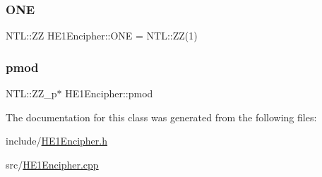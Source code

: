 \subsubsection{\texorpdfstring{O\+NE}{ONE}}
{\footnotesize\ttfamily N\+T\+L\+::\+ZZ H\+E1\+Encipher\+::\+O\+NE = N\+T\+L\+::\+ZZ(1)\hspace{0.3cm}{\ttfamily [static]}}

\mbox{\label{classHE1Encipher_a4fa8ff49fc93cf01a0814aa83141e725}} 
\subsubsection{\texorpdfstring{pmod}{pmod}}
{\footnotesize\ttfamily N\+T\+L\+::\+Z\+Z\+\_\+p$\ast$ H\+E1\+Encipher\+::pmod\hspace{0.3cm}{\ttfamily [protected]}}



The documentation for this class was generated from the following files\+:\begin{DoxyCompactItemize}
\item 
include/\hyperlink{HE1Encipher_8h}{H\+E1\+Encipher.\+h}\item 
src/\hyperlink{HE1Encipher_8cpp}{H\+E1\+Encipher.\+cpp}\end{DoxyCompactItemize}
